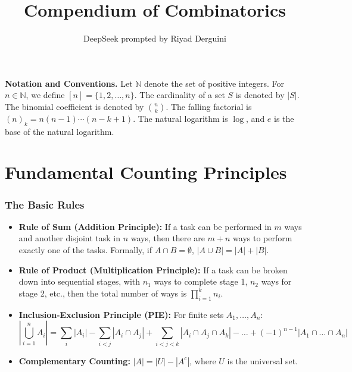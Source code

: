 \documentclass[11pt]{article}
\title{Compendium of Combinatorics}
\author{DeepSeek prompted by Riyad Derguini}
\date{}
\begin{document}
\maketitle

\textbf{Notation and Conventions.} Let \(\mathbb{N}\) denote the set of positive integers. For \(n \in \mathbb{N}\), we define \([n] = \{1, 2, \dots, n\}\). The cardinality of a set \(S\) is denoted by \(|S|\). The binomial coefficient is denoted by \(\binom{n}{k}\). The falling factorial is \((n)_k = n(n-1)\cdots(n-k+1)\). The natural logarithm is \(\log\), and \(e\) is the base of the natural logarithm.

\hrulefill

\part{Fundamental Counting Principles}

\section{The Basic Rules}
\begin{itemize}
    \item \textbf{Rule of Sum (Addition Principle):} If a task can be performed in \(m\) ways and another disjoint task in \(n\) ways, then there are \(m + n\) ways to perform exactly one of the tasks. Formally, if \(A \cap B = \emptyset\), \(|A \cup B| = |A| + |B|\).
    \item \textbf{Rule of Product (Multiplication Principle):} If a task can be broken down into sequential stages, with \(n_1\) ways to complete stage 1, \(n_2\) ways for stage 2, etc., then the total number of ways is \(\prod_{i=1}^k n_i\).
    \item \textbf{Inclusion-Exclusion Principle (PIE):} For finite sets \(A_1, \dots, A_n\):
    \[
 \left| \bigcup_{i=1}^n A_i \right| = \sum_{i} |A_i| - \sum_{i < j} |A_i \cap A_j| + \sum_{i < j < k} |A_i \cap A_j \cap A_k| - \dots + (-1)^{n-1} |A_1 \cap \dots \cap A_n| 
\]
    \item \textbf{Complementary Counting:} \(|A| = |U| - |A^c|\), where \(U\) is the universal set.
\end{itemize}
\end{document}
